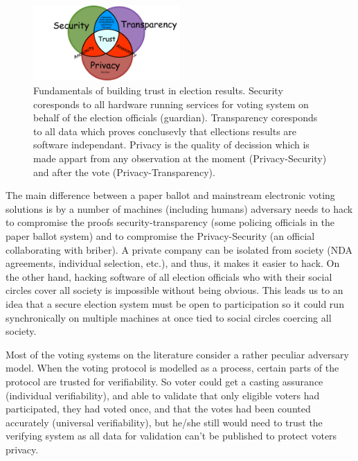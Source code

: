 \documentclass[12pt,a4paper]{article}
\let\oldincludegraphics\includegraphics
\renewcommand{\includegraphics}[1]{\oldincludegraphics[width=0.5\textwidth]{#1}}
\begin{document}
\begin{figure}
\centering
\includegraphics{figures/trust}
\caption{Fundamentals of building trust in election results. Security coresponds to all hardware running services for voting system on behalf of the election officials (guardian). Transparency coresponds to all data which proves conclusevly that ellections results are software independant. Privacy is the quality of decission which is made appart from any observation at the moment (Privacy-Security) and after the vote (Privacy-Transparency).}
\end{figure}
\par
The main difference between a paper ballot and mainstream electronic voting solutions is by a number of machines (including humans) adversary needs to hack to compromise the proofs security-transparency (some policing officials in the paper ballot system) and to compromise the Privacy-Security (an official collaborating with briber). A private company can be isolated from society (NDA agreements, individual selection, etc.), and thus, it makes it easier to hack. On the other hand, hacking software of all election officials who with their social circles cover all society is impossible without being obvious. This leads us to an idea that a secure election system must be open to participation so it could run synchronically on multiple machines at once tied to social circles coercing all society.\par
Most of the voting systems on the literature consider a rather peculiar adversary model. When the voting protocol is modelled as a process, certain parts of the protocol are trusted for verifiability. So voter could get a casting assurance (individual verifiability), and able to validate that only eligible voters had participated, they had voted once, and that the votes had been counted accurately (universal verifiability), but he/she still would need to trust the verifying system as all data for validation can't be published to protect voters privacy.\par
\end{document}
